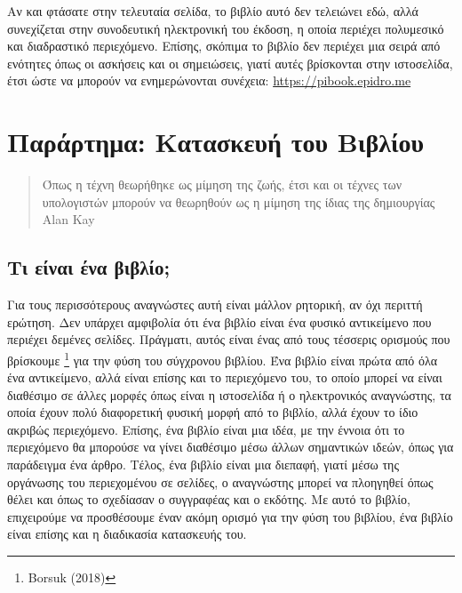 \documentclass[
]{article}
\begin{document}
Αν και φτάσατε στην τελευταία σελίδα, το βιβλίο αυτό δεν τελειώνει εδώ,
αλλά συνεχίζεται στην συνοδευτική ηλεκτρονική του έκδοση, η οποία
περιέχει πολυμεσικό και διαδραστικό περιεχόμενο. Επίσης, σκόπιμα το
βιβλίο δεν περιέχει μια σειρά από ενότητες όπως οι ασκήσεις και οι
σημειώσεις, γιατί αυτές βρίσκονται στην ιστοσελίδα, έτσι ώστε να μπορούν
να ενημερώνονται συνέχεια: \url{https://pibook.epidro.me}

\hypertarget{ux3c0ux3b1ux3c1ux3acux3c1ux3c4ux3b7ux3bcux3b1-ux3baux3b1ux3c4ux3b1ux3c3ux3baux3b5ux3c5ux3ae-ux3c4ux3bfux3c5-ux3b2ux3b9ux3b2ux3bbux3afux3bfux3c5}{%
\section{Παράρτημα: Κατασκευή του
Βιβλίου}\label{ux3c0ux3b1ux3c1ux3acux3c1ux3c4ux3b7ux3bcux3b1-ux3baux3b1ux3c4ux3b1ux3c3ux3baux3b5ux3c5ux3ae-ux3c4ux3bfux3c5-ux3b2ux3b9ux3b2ux3bbux3afux3bfux3c5}}

\begin{quote}
Όπως η τέχνη θεωρήθηκε ως μίμηση της ζωής, έτσι και οι τέχνες των
υπολογιστών μπορούν να θεωρηθούν ως η μίμηση της ίδιας της δημιουργίας
Alan Kay
\end{quote}

\hypertarget{ux3c4ux3b9-ux3b5ux3afux3bdux3b1ux3b9-ux3adux3bdux3b1-ux3b2ux3b9ux3b2ux3bbux3afux3bf}{%
\subsection{Τι είναι ένα
βιβλίο;}\label{ux3c4ux3b9-ux3b5ux3afux3bdux3b1ux3b9-ux3adux3bdux3b1-ux3b2ux3b9ux3b2ux3bbux3afux3bf}}

Για τους περισσότερους αναγνώστες αυτή είναι μάλλον ρητορική, αν όχι
περιττή ερώτηση. Δεν υπάρχει αμφιβολία ότι ένα βιβλίο είναι ένα φυσικό
αντικείμενο που περιέχει δεμένες σελίδες. Πράγματι, αυτός είναι ένας από
τους τέσσερις ορισμούς που βρίσκουμε \footnote{Borsuk (2018)} για την
φύση του σύγχρονου βιβλίου. Ένα βιβλίο είναι πρώτα από όλα ένα
αντικείμενο, αλλά είναι επίσης και το περιεχόμενο του, το οποίο μπορεί
να είναι διαθέσιμο σε άλλες μορφές όπως είναι η ιστοσελίδα ή ο
ηλεκτρονικός αναγνώστης, τα οποία έχουν πολύ διαφορετική φυσική μορφή
από το βιβλίο, αλλά έχουν το ίδιο ακριβώς περιεχόμενο. Επίσης, ένα
βιβλίο είναι μια ιδέα, με την έννοια ότι το περιεχόμενο θα μπορούσε να
γίνει διαθέσιμο μέσω άλλων σημαντικών ιδεών, όπως για παράδειγμα ένα
άρθρο. Τέλος, ένα βιβλίο είναι μια διεπαφή, γιατί μέσω της οργάνωσης του
περιεχομένου σε σελίδες, ο αναγνώστης μπορεί να πλοηγηθεί όπως θέλει και
όπως το σχεδίασαν ο συγγραφέας και ο εκδότης. Με αυτό το βιβλίο,
επιχειρούμε να προσθέσουμε έναν ακόμη ορισμό για την φύση του βιβλίου,
ένα βιβλίο είναι επίσης και η διαδικασία κατασκευής του.
\end{document}
